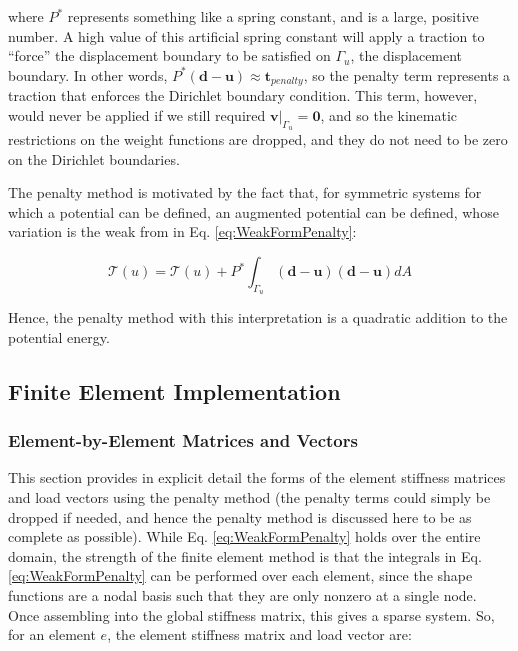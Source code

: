 \documentclass[10pt]{article}
\begin{document}
where \(P^{*}\) represents something like a spring constant, and is a large, positive number. A high value of this artificial spring constant will apply a traction to ``force'' the displacement boundary to be satisfied on \(\Gamma_u\), the displacement boundary. In other words, \(P^{*}(\textbf{d}-\textbf{u})\approx\textbf{t}_{penalty}\), so the penalty term represents a traction that enforces the Dirichlet boundary condition. This term, however, would never be applied if we still required \(\textbf{v}|_{\Gamma_u}=\textbf{0}\), and so the kinematic restrictions on the weight functions are dropped, and they do not need to be zero on the Dirichlet boundaries.

The penalty method is motivated by the fact that, for symmetric systems for which a potential can be defined, an augmented potential can be defined, whose variation is the weak from in Eq. \eqref{eq:WeakFormPenalty}:

\begin{equation}
\mathscr{T}(u)=\mathscr{T}(u)+P^{*}\int_{\Gamma_u}(\textbf{d}-\textbf{u})(\textbf{d}-\textbf{u})dA
\end{equation}

Hence, the penalty method with this interpretation is a quadratic addition to the potential energy. 

\subsection{Finite Element Implementation}
\label{sec:FEElement}

\subsubsection{Element-by-Element Matrices and Vectors}

This section provides in explicit detail the forms of the element stiffness matrices and load vectors using the penalty method (the penalty terms could simply be dropped if needed, and hence the penalty method is discussed here to be as complete as possible). While Eq. \eqref{eq:WeakFormPenalty} holds over the entire domain, the strength of the finite element method is that the integrals in Eq. \eqref{eq:WeakFormPenalty} can be performed over each element, since the shape functions are a nodal basis such that they are only nonzero at a single node. Once assembling into the global stiffness matrix, this gives a sparse system. So, for an element \(e\), the element stiffness matrix and load vector are:
\end{document}
